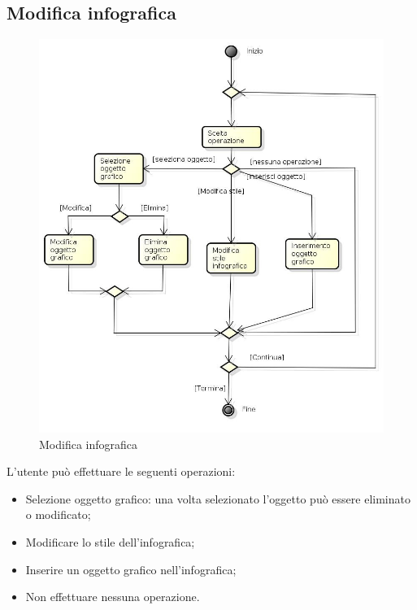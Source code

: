 \newpage

\subsection{Modifica infografica}

\begin{figure}[h!]
		\centering
		\includegraphics[scale=.5]{img/Modifica_infografica.jpg}
		\caption{Modifica infografica}
		\label{fig:Modifica_infografica}
\end{figure}

L'utente può effettuare le seguenti operazioni:
\begin{itemize}
\item Selezione oggetto grafico: una volta selezionato l'oggetto può essere eliminato o modificato;
\item Modificare lo stile dell'infografica;
\item Inserire un oggetto grafico nell'infografica;
\item Non effettuare nessuna operazione.
\end{itemize}

\newpage

